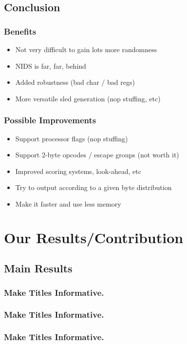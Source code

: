 \documentclass{beamer}
\newenvironment{sitemize}{\begin{itemize}\itemsep 5pt\large}{\end{itemize}}
\begin{document}
\subsection{Conclusion}
\begin{frame}
  \frametitle{Benefits}
  \begin{sitemize}
    \item Not very difficult to gain lots more randomness
    \item NIDS is far, far, behind
    \item Added robustness (bad char / bad regs)
    \item More versatile sled generation (nop stuffing, etc)
  \end{sitemize}
\end{frame}
\begin{frame}
  \frametitle{Possible Improvements}
  \begin{sitemize}
    \item Support processor flags (nop stuffing)
    \item Support 2-byte opcodes / escape groups (not worth it)
    \item Improved scoring systems, look-ahead, etc
    \item Try to output according to a given byte distribution
    \item Make it faster and use less memory
  \end{sitemize}
\end{frame}





\section{Our Results/Contribution}

\subsection{Main Results}

\begin{frame}
  \frametitle{Make Titles Informative.}
\end{frame}

\begin{frame}
  \frametitle{Make Titles Informative.}
\end{frame}

\begin{frame}
  \frametitle{Make Titles Informative.}
\end{frame}
\end{document}

